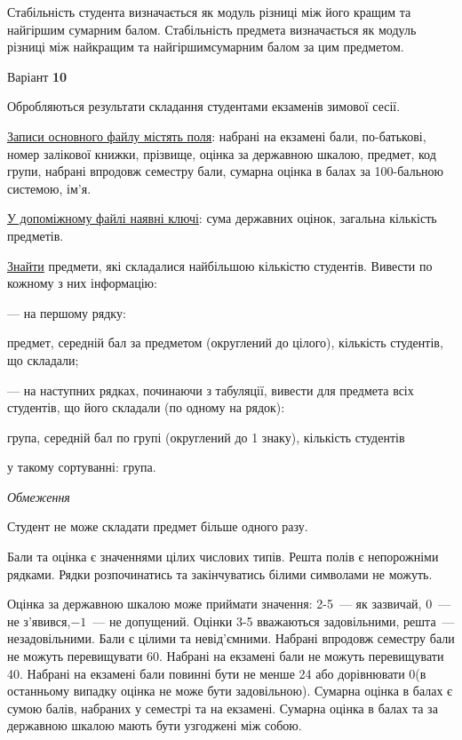\documentclass[11pt, ukrainian]{article}
\begin{document}
Стабільність студента визначається як модуль різниці між його кращим та найгіршим сумарним балом.
Стабільність предмета визначається як модуль різниці між найкращим та найгіршимсумарним балом за цим предметом.




\par
\newpage
{\center Варіант  \No \textbf { 10 }\par}
\bigskip
Обробляються результати складання студентами екзаменів зимової сесії.

\underline{Записи основного файлу містять поля}: набрані на екзамені бали, по-батькові, номер залікової книжки, прізвище, оцінка за державною шкалою, предмет, код групи, набрані впродовж семестру бали, сумарна оцінка в балах за 100-бальною системою, ім’я.

\underline{У допоміжному файлі наявні ключі}: сума державних оцінок, загальна кількість предметів.

\underline{Знайти} предмети, які складалися найбільшою кількістю студентів. Вивести по кожному з них інформацію:\par
{\noindent}--- на першому рядку:\par
предмет, середній бал за предметом (округлений до цілого), кількість студентів, що складали;

{\noindent}--- на наступних рядках, починаючи з табуляції, вивести для предмета всіх студентів, що його складали (по одному на рядок):\par
група, середній бал по групі (округлений до 1 знаку), кількість студентів

{\noindent}у такому сортуванні: група.


\bigskip\textit{Обмеження}

Студент не може складати предмет більше одного разу.

Бали та оцінка є значеннями цілих числових типів. Решта полів є непорожніми рядками.
Рядки розпочинатись та закінчуватись білими символами не можуть.

Оцінка за державною шкалою може приймати значення: 2-5~--- як зазвичай, 0~--- не з’явився,$-1$~--- не допущений. 
Оцінки 3-5 вважаються задовільними, решта~--- незадовільними. 
Бали є цілими та невід’ємними.
Набрані впродовж семестру бали не можуть перевищувати 60. 
Набрані на екзамені бали не можуть перевищувати 40. 
Набрані на екзамені бали повинні бути не менше 24 або дорівнювати 0(в останньому випадку оцінка не може бути задовільною). 
Сумарна оцінка в балах є сумою балів, набраних у семестрі та на екзамені.
Сумарна оцінка в балах та за державною шкалою мають бути узгоджені між собою.
\end{document}
